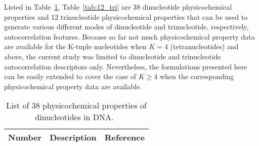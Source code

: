 Listed in Table~\ref{tab:38_di}, Table~\ref{tab:12_tri} are 38 dinucleotide physicochemical properties and 12 trinucleotide physicochemical properties that can be used to generate various different modes of dinucleotide and trinucleotide, respectively, autocorrelation features. Because so far not much physicochemical property data are available for the K-tuple nucleotides when $K = 4$ (tetranucleotides) and above, the current study was limited to dinucleotide and trinucleotide autocorrelation descriptors only. Nevertheless, the formulations presented here can be easily extended to cover the case of $K \geq 4$ when the corresponding physicochemical property data are available.


\begin{footnotesize}
    \begin{longtable}{ccc}
        \caption{List of 38 physicochemical properties of dinucleotides in DNA.~\cite{Chen2014PseKNC:Composition}}
        \label{tab:38_di}
        \endfirsthead
        \endhead
        \toprule
        \textbf{Number} & \textbf{Description} & \textbf{Reference}\\\midrule
        

\end{longtable}
\end{footnotesize}

